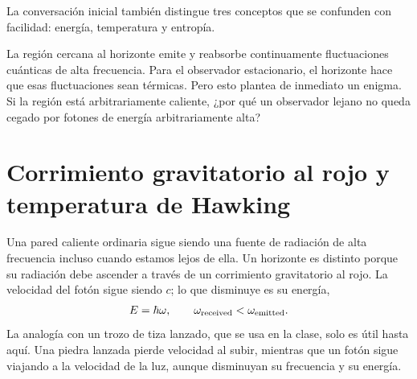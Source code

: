 La conversación inicial también distingue tres conceptos que se confunden con facilidad: energía, temperatura y entropía.

\begin{classroomqa}
\end{classroomqa}


La región cercana al horizonte emite y reabsorbe continuamente fluctuaciones cuánticas de alta frecuencia. Para el observador estacionario, el horizonte hace que esas fluctuaciones sean térmicas. Pero esto plantea de inmediato un enigma. Si la región está arbitrariamente caliente, ¿por qué un observador lejano no queda cegado por fotones de energía arbitrariamente alta?

\section{Corrimiento gravitatorio al rojo y temperatura de Hawking}

Una pared caliente ordinaria sigue siendo una fuente de radiación de alta frecuencia incluso cuando estamos lejos de ella. Un horizonte es distinto porque su radiación debe ascender a través de un corrimiento gravitatorio al rojo. La velocidad del fotón sigue siendo \(c\); lo que disminuye es su energía,
\begin{equation}
E=\hbar\omega,
\qquad
\omega_{\rm received}<\omega_{\rm emitted}.
\end{equation}
La analogía con un trozo de tiza lanzado, que se usa en la clase, solo es útil hasta aquí. Una piedra lanzada pierde velocidad al subir, mientras que un fotón sigue viajando a la velocidad de la luz, aunque disminuyan su frecuencia y su energía.

